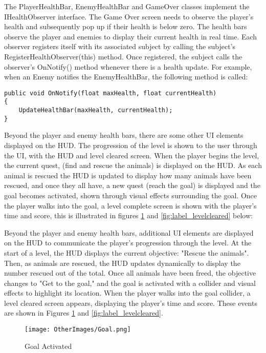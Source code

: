 \documentclass[]{final_report}
\begin{document}
The PlayerHealthBar, EnemyHealthBar and GameOver classes implement the IHealthObserver interface. The Game Over screen needs to observe the player's health and subsequently pop up if their health is below zero. 
The health bars observe the player and enemies to display their current health in real time. Each observer registers itself with its associated subject by calling the subject's RegisterHealthObserver(this) method. Once registered, the subject calls the observer's OnNotify() method whenever there is a health update. For example, when an Enemy notifies the EnemyHealthBar, the following method is called:
\begin{verbatim}
public void OnNotify(float maxHealth, float currentHealth)
{
    UpdateHealthBar(maxHealth, currentHealth);
}
\end{verbatim}

\color{red} Beyond the player and enemy health bars, there are some other UI elements displayed on the HUD. The progression of the level is shown to the user through the UI, with the HUD and level cleared screen. When the player begins the level, the current quest, (find and rescue the animals) is displayed on the HUD. As each animal is rescued the HUD is updated to display how many animals have been rescued, and once they all have, a new quest (reach the goal) is displayed and the goal becomes activated, shown through visual effects surrounding the goal. Once the player walks into the goal, a level complete screen is shown with the player's time and score, this is illustrated in figures \ref{fig:label_goal} and  \ref{fig:label_levelcleared} below:

Beyond the player and enemy health bars, additional UI elements are displayed on the HUD to communicate the player's progression through the level. At the start of a level, the HUD displays the current objective: "Rescue the animals". Then, as animals are rescued, the HUD updates dynamically to display the number rescued out of the total. Once all animals have been freed, the objective changes to "Get to the goal," and the goal is activated with a collider and visual effects to highlight its location. When the player walks into the goal collider, a level cleared screen appears, displaying the player's time and score. These events are shown in Figures \ref{fig:label_goal} and \ref{fig:label_levelcleared}. 
\begin{figure}[H]
    \centering
    \texttt{[image: OtherImages/Goal.png]}
    \caption{Goal Activated}
    \label{fig:label_goal}
\end{figure}
\end{document}
